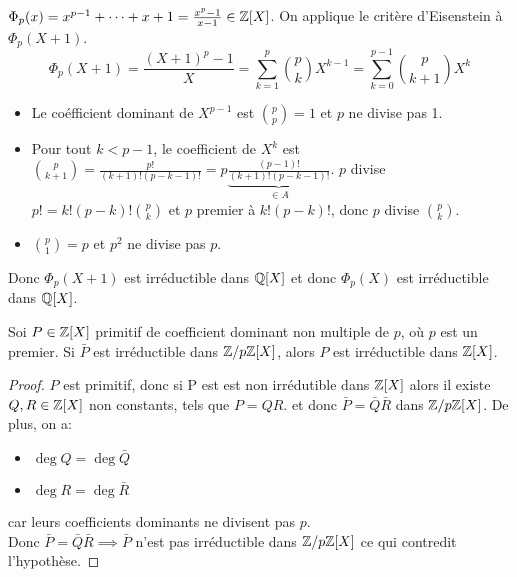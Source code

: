 \begin{example}
	$\Phi_p(x) = x^{p-1} + \cdots + x + 1  = \frac{x^p - 1}{x-1} \in \mathbb{Z}[X]$.
	On applique le critère d'Eisenstein à $\Phi_p(X+1)$.
	$$ \Phi_p(X+1) = \frac{(X+1)^p - 1}{X} = \sum_{k=1}^p \binom{p}{k} X^{k-1} = \sum_{k=0}^{p-1} \binom{p}{k+1} X^k$$
	\begin{itemize}
		\item Le coéfficient dominant de $X^{p-1}$ est $\binom{p}{p} = 1$ et $p$ ne divise pas 1.
		\item Pour tout $k < p-1$, le coefficient de $X^k$ est $\binom{p}{k+1} = \frac{p!}{(k+1)!(p-k-1)!} = p \underbrace{\frac{(p-1)!}{(k+1)!(p-k-1)!}}_{\in A}$.
		      $p$ divise $p! = k!(p-k)!\binom{p}{k}$ et $p$ premier à $k!(p-k)!$, donc $p$ divise $\binom{p}{k}$.
		\item $\binom{p}{1} = p$ et $p^2$ ne divise pas $p$.
	\end{itemize}
	Donc $\Phi_p(X+1)$ est irréductible dans $\mathbb{Q}[X]$ et donc $\Phi_p(X)$ est irréductible dans $\mathbb{Q}[X]$.
\end{example}


\begin{prop}
	Soi $P \in \mathbb{Z}[X]$ primitif de coefficient dominant non multiple de $p$, où $p$ est un premier.
	Si $\bar{P}$ est irréductible dans  $\mathbb{Z}/p\mathbb{Z}[X]$, alors $P$ est irréductible dans $\mathbb{Z}[X]$.
\end{prop}

\begin{proof}
	$P$ est primitif, donc si P est est non irrédutible dans $\mathbb{Z}[X]$ alors il existe $Q, R \in \mathbb{Z}[X]$ non constants, tels que $P = QR$.
	et donc $\bar{P} = \bar{Q}\bar{R}$ dans $\mathbb{Z}/p\mathbb{Z}[X]$.
	De plus, on a:
	\begin{itemize}
		\item $\deg Q = \deg \bar{Q}$
		\item $\deg R = \deg \bar{R}$

	\end{itemize}
	car leurs coefficients dominants ne divisent pas $p$.\\
	Donc $\bar{P} = \bar{Q}\bar{R} \implies \bar{P}$ n'est pas irréductible dans $\mathbb{Z}/p\mathbb{Z}[X]$ ce qui contredit l'hypothèse.
\end{proof}
